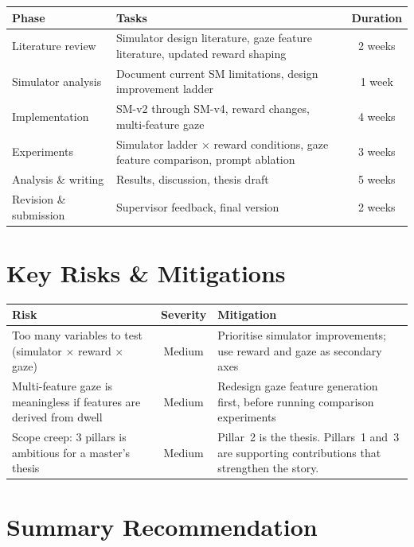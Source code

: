 \documentclass[11pt,a4paper]{article}
\begin{document}
\begin{table}[h]
\centering
\begin{tabularx}{\textwidth}{l X c}
\toprule
\textbf{Phase} & \textbf{Tasks} & \textbf{Duration} \\
\midrule
Literature review & Simulator design literature, gaze feature literature, updated reward shaping & 2 weeks \\
\addlinespace
Simulator analysis & Document current SM limitations, design improvement ladder & 1 week \\
\addlinespace
Implementation & SM-v2 through SM-v4, reward changes, multi-feature gaze & 4 weeks \\
\addlinespace
Experiments & Simulator ladder $\times$ reward conditions, gaze feature comparison, prompt ablation & 3 weeks \\
\addlinespace
Analysis \& writing & Results, discussion, thesis draft & 5 weeks \\
\addlinespace
Revision \& submission & Supervisor feedback, final version & 2 weeks \\
\bottomrule
\end{tabularx}
\end{table}


\section{Key Risks \& Mitigations}

\begin{table}[h]
\centering
\begin{tabularx}{\textwidth}{X c X}
\toprule
\textbf{Risk} & \textbf{Severity} & \textbf{Mitigation} \\
\midrule
Too many variables to test (simulator $\times$ reward $\times$ gaze) & Medium & Prioritise simulator improvements; use reward and gaze as secondary axes \\
\addlinespace
Multi-feature gaze is meaningless if features are derived from dwell & Medium & Redesign gaze feature generation first, before running comparison experiments \\
\addlinespace
Scope creep: 3 pillars is ambitious for a master's thesis & Medium & Pillar~2 is the thesis. Pillars~1 and~3 are supporting contributions that strengthen the story. \\
\bottomrule
\end{tabularx}
\end{table}


\section{Summary Recommendation}
\end{document}
